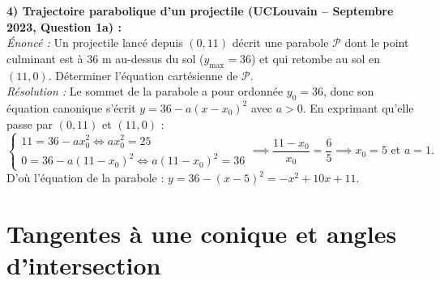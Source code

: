 \begin{exemple}
\medskip
\textbf{4) Trajectoire parabolique d'un projectile (UCLouvain -- Septembre 2023, Question 1a) :}\\
\emph{Énoncé :} Un projectile lancé depuis $(0, 11)$ décrit une parabole $\mathcal{P}$ dont le point culminant est à $36\text{ m}$ au-dessus du sol ($y_{\max} = 36$) et qui retombe au sol en $(11, 0)$. Déterminer l'équation cartésienne de $\mathcal{P}$.\\
\emph{Résolution :} Le sommet de la parabole a pour ordonnée $y_0 = 36$, donc son équation canonique s'écrit $y = 36 - a(x - x_0)^2$ avec $a > 0$. En exprimant qu'elle passe par $(0, 11)$ et $(11, 0)$ :
\[
    \begin{cases} 11 = 36 - a x_0^2 \iff a x_0^2 = 25 \\ 0 = 36 - a(11 - x_0)^2 \iff a(11 - x_0)^2 = 36 \end{cases} \implies \frac{11 - x_0}{x_0} = \frac{6}{5} \implies x_0 = 5 \text{ et } a = 1.
\]
D'où l'équation de la parabole : $\boxed{y = 36 - (x-5)^2 = -x^2 + 10x + 11}$.
\end{exemple}

\section{Tangentes à une conique et angles d'intersection}

